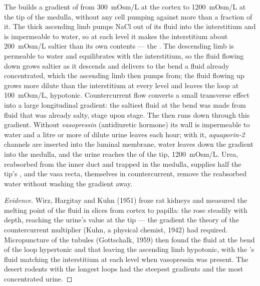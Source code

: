 \begin{proposition}\label{prop:b3:renal-osmoregulation:countercurrent}
The  builds a gradient of  from \qty{300}{mOsm/L}
at the cortex to \qty{1200}{mOsm/L} at the tip of the medulla, without
any cell pumping against more than a fraction of it. The thick
ascending limb pumps NaCl out of its fluid into the interstitium and
is impermeable to water, so at each level it makes the interstitium
about \qty{200}{mOsm/L} saltier than its own contents --- the
\emph{}. The descending limb is permeable to water and
equilibrates with the interstitium, so the fluid flowing down grows
saltier as it descends and delivers to the bend a fluid already
concentrated, which the ascending limb then pumps from; the fluid
flowing up grows more dilute than the interstitium at every level and
leaves the loop at \qty{100}{mOsm/L}, hypotonic. Countercurrent flow
converts a small transverse effect into a large longitudinal gradient:
the saltiest fluid at the bend was made from fluid that was already
salty, stage upon stage. The  then runs down through
this gradient. Without \emph{vasopressin} (antidiuretic hormone) its
wall is impermeable to water and a litre or more of dilute urine
leaves each hour; with it, \emph{aquaporin-2} channels are inserted into
the luminal membrane, water leaves down the gradient into the
medulla, and the urine reaches the  of the tip,
\qty{1200}{mOsm/L}. Urea, reabsorbed from the inner duct and trapped in
the medulla, supplies half the tip's , and the vasa recta,
themselves in countercurrent, remove the reabsorbed water without
washing the gradient away.
\end{proposition}

\begin{proof}[Evidence]
Wirz, Hargitay and Kuhn (1951) froze rat kidneys and measured the
melting point of the fluid in slices from cortex to papilla: the
 rose steadily with depth, reaching the urine's value at the
tip --- the gradient the theory of the countercurrent multiplier (Kuhn,
a physical chemist, 1942) had required. Micropuncture of the tubules
(Gottschalk, 1959) then found the fluid at the bend of the loop
hypertonic and that leaving the ascending limb hypotonic, with the
's fluid matching the interstitium at each level when
vasopressin was present. The desert rodents with the longest loops had
the steepest gradients and the most concentrated urine.
\end{proof}

